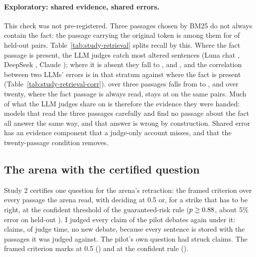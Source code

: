 \begin{table}[t]
\centering\small
{}
\caption{Exploratory: error correlation within the two evidence strata of Table~\ref{tab:study-retrieval}.}
\label{tab:study-retrieval-corr}
\end{table}

\paragraph{Exploratory: shared evidence, shared errors.} This check was not pre-registered. Three passages chosen by BM25 do not always contain the fact: the passage carrying the original token is among them for \studyRetrievalShare{} of held-out pairs. Table~\ref{tab:study-retrieval} splits recall by this. Where the fact passage is present, the LLM judges catch most altered sentences (Luna chat \studyRetrRecallPresentLunaChat{}, DeepSeek \studyRetrRecallPresentDeepseekPro{}, Claude \studyRetrRecallPresentClaude{}); where it is absent they fall to \studyRetrRecallAbsentLunaChat{}, \studyRetrRecallAbsentDeepseekPro{} and \studyRetrRecallAbsentClaude{}, and the correlation between two LLMs' errors is \studyRetrPhiAbsentLunaChatDeepseekPro{} in that stratum against \studyRetrPhiPresentLunaChatDeepseekPro{} where the fact is present (Table~\ref{tab:study-retrieval-corr}). \jev{} over three passages falls from \studyRetrRecallPresentJevThree{} to \studyRetrRecallAbsentJevThree{}, and over twenty, where the fact passage is always read, stays at \studyRetrRecallAbsentJevTwoZero{} on the same pairs. Much of what the LLM judges share on \dc{} is therefore the evidence they were handed: models that read the three passages carefully and find no passage about the fact all answer the same way, and that answer is wrong by construction. Shared error has an evidence component that a judge-only account misses, and that the twenty-passage condition removes.

\FloatBarrier
\subsection{The arena with the certified question}
\label{sec:arena-v2}

Study 2 certifies one question for the arena's retraction: the framed criterion over every passage the arena read, with \jev{} deciding at 0.5 or, for a strike that has to be right, at the confident threshold of the guaranteed-risk rule ($p \geq 0.88{}$, about 5\% error on held-out \dc{}). I judged every claim of the \studyLbDebates{} pilot debates again under it: \studyLbClaims{} claims, \studyLbCost{} of judge time, no new debate, because every sentence is stored with the passages it was judged against. The pilot's own question had struck \studyLbPilotStruck{} claims. The framed criterion marks \studyLbContradicted{} at 0.5 (\studyLbRateAll{}) and \studyLbContradictedConfident{} at the confident rule (\studyLbRateAllConfident{}).

